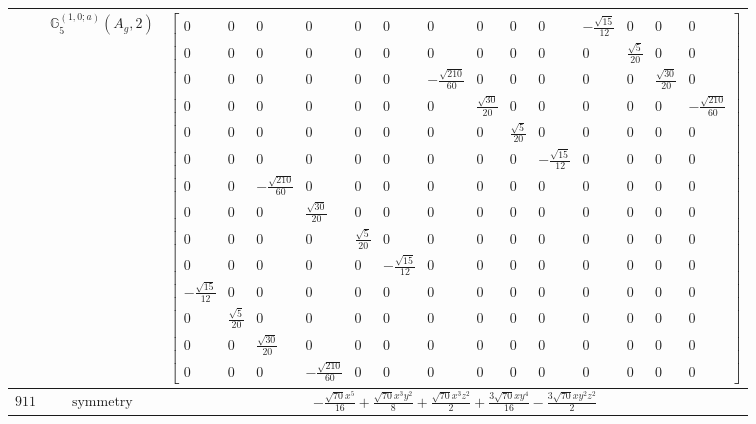 \documentclass[fleqn,8pt,landscape]{jsarticle}
\begin{document}
\begin{longtable}{ccc}
$  $ & $ \mathbb{G}_{5}^{(1,0;a)}(A_{g},2) $ & $ \begin{bmatrix} 0 & 0 & 0 & 0 & 0 & 0 & 0 & 0 & 0 & 0 & - \frac{\sqrt{15}}{12} & 0 & 0 & 0 \\ 0 & 0 & 0 & 0 & 0 & 0 & 0 & 0 & 0 & 0 & 0 & \frac{\sqrt{5}}{20} & 0 & 0 \\ 0 & 0 & 0 & 0 & 0 & 0 & - \frac{\sqrt{210}}{60} & 0 & 0 & 0 & 0 & 0 & \frac{\sqrt{30}}{20} & 0 \\ 0 & 0 & 0 & 0 & 0 & 0 & 0 & \frac{\sqrt{30}}{20} & 0 & 0 & 0 & 0 & 0 & - \frac{\sqrt{210}}{60} \\ 0 & 0 & 0 & 0 & 0 & 0 & 0 & 0 & \frac{\sqrt{5}}{20} & 0 & 0 & 0 & 0 & 0 \\ 0 & 0 & 0 & 0 & 0 & 0 & 0 & 0 & 0 & - \frac{\sqrt{15}}{12} & 0 & 0 & 0 & 0 \\ 0 & 0 & - \frac{\sqrt{210}}{60} & 0 & 0 & 0 & 0 & 0 & 0 & 0 & 0 & 0 & 0 & 0 \\ 0 & 0 & 0 & \frac{\sqrt{30}}{20} & 0 & 0 & 0 & 0 & 0 & 0 & 0 & 0 & 0 & 0 \\ 0 & 0 & 0 & 0 & \frac{\sqrt{5}}{20} & 0 & 0 & 0 & 0 & 0 & 0 & 0 & 0 & 0 \\ 0 & 0 & 0 & 0 & 0 & - \frac{\sqrt{15}}{12} & 0 & 0 & 0 & 0 & 0 & 0 & 0 & 0 \\ - \frac{\sqrt{15}}{12} & 0 & 0 & 0 & 0 & 0 & 0 & 0 & 0 & 0 & 0 & 0 & 0 & 0 \\ 0 & \frac{\sqrt{5}}{20} & 0 & 0 & 0 & 0 & 0 & 0 & 0 & 0 & 0 & 0 & 0 & 0 \\ 0 & 0 & \frac{\sqrt{30}}{20} & 0 & 0 & 0 & 0 & 0 & 0 & 0 & 0 & 0 & 0 & 0 \\ 0 & 0 & 0 & - \frac{\sqrt{210}}{60} & 0 & 0 & 0 & 0 & 0 & 0 & 0 & 0 & 0 & 0 \end{bmatrix} $ \\ \hline
$ 911 $ & $ \text{symmetry} $ & $ - \frac{\sqrt{70} x^{5}}{16} + \frac{\sqrt{70} x^{3} y^{2}}{8} + \frac{\sqrt{70} x^{3} z^{2}}{2} + \frac{3 \sqrt{70} x y^{4}}{16} - \frac{3 \sqrt{70} x y^{2} z^{2}}{2} $ \\

\end{longtable}
\end{document}

